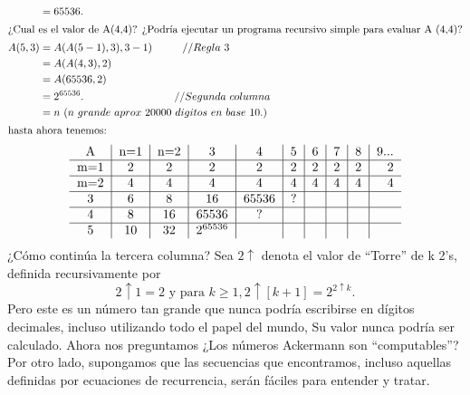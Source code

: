 \begin{align*}
	&=65536.\\
	\intertext{¿Cual es el valor de A(4,4)?  
	¿Podría ejecutar un programa recursivo simple para evaluar A (4,4)?}
	A(5,3) &= A(A(5-1),3),3-1) \hspace*{1cm} // Regla~3\\
	&= A(A(4,3), 2) \hspace*{2cm} \\
	&=A(65536,2)	\hspace*{2,3cm}\\
	&=2^{65536}.\hspace*{3cm}// Segunda~columna\\
	&=n~(n~ grande~aprox~20000~digitos~en~base~10.)\\
	\intertext{hasta ahora tenemos:}
\end{align*}
\begin{equation*}
\begin{tabular}{c|c|c|c|c|c|c|c|c|r}
A & n=1 & n=2 & 3 & 4 & 5 & 6 & 7 & 8 & 9... \\
\hline
m=1 & 2 & 2 & 2 & 2 & 2 & 2 & 2 & 2 & 2 \\
\hline
m=2 & 4 & 4 & 4 & 4 & 4 & 4 & 4 & 4 & 4 \\
\hline
3   & 6 & 8 & 16 & 65536 & ? &  &  &  &  \\
\hline
4   & 8 & 16 & 65536 & ? &  &  &  &  &  \\
\hline
5  & 10 & 32 & $2^{65536}$ &  &  &  &  &  &  \\
\end{tabular}
\end{equation*}
¿Cómo continúa la tercera columna? Sea $2\uparrow$ denota el valor de ``Torre'' de k 2's, definida recursivamente por \[ 2\uparrow 1=2 \text{ y para } k\geq1,2\uparrow[k+1]=2^{2\uparrow k}. \]
Pero este es un número tan grande que nunca podría escribirse en dígitos decimales, incluso utilizando todo el papel del mundo, Su valor nunca podría ser calculado. Ahora nos preguntamos ¿Los números Ackermann son “computables”? Por otro lado, supongamos que las secuencias que encontramos, incluso aquellas definidas por ecuaciones de recurrencia, serán fáciles para entender y tratar.